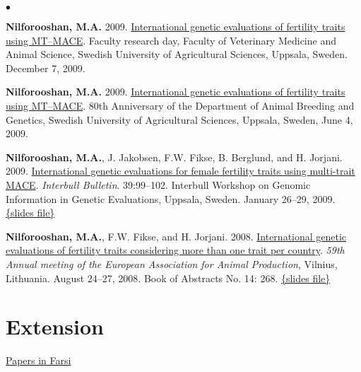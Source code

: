\documentclass[margin,line]{res}
\newenvironment{list2}{
  \begin{list}{$\bullet$}{%
    \setlength{\itemsep}{0in}
    \setlength{\parsep}{0in} \setlength{\parskip}{0in}
    \setlength{\topsep}{0in} \setlength{\partopsep}{0in}
    \setlength{\leftmargin}{0.2in}}}
  {\end{list}}
\begin{document}
\begin{resume}
\begin{list2}
    \item {\bf Nilforooshan, M.A.} 2009. \href{https://drive.google.com/file/d/0B2l_izQwJmVpUC1TVkx2MVc1ZUE/view?usp=sharing&resourcekey=0-l8dXNYtXDSBuYJHiZwAxZQ}{International genetic evaluations of fertility traits using MT–MACE}. Faculty research day, Faculty of Veterinary Medicine and Animal Science, Swedish University of Agricultural Sciences, Uppsala, Sweden. December 7, 2009.
    \item {\bf Nilforooshan, M.A.} 2009. \href{https://drive.google.com/file/d/0B2l_izQwJmVpUC1TVkx2MVc1ZUE/view?usp=sharing&resourcekey=0-l8dXNYtXDSBuYJHiZwAxZQ}{International genetic evaluations of fertility traits using MT–MACE}. 80th Anniversary of the Department of Animal Breeding and Genetics, Swedish University of Agricultural Sciences, Uppsala, Sweden, June 4, 2009.
    \item {\bf Nilforooshan, M.A.}, J. Jakobsen, F.W. Fikse, B. Berglund, and H. Jorjani. 2009. \href{https://www.researchgate.net/publication/237781427_International_Genetic_Evaluations_for_Female_Fertility_Traits_Using_Multi-trait_MACE}{International genetic evaluations for female fertility traits using multi-trait MACE}. {\em Interbull Bulletin}. 39:99--102. Interbull Workshop on Genomic Information in Genetic Evaluations, Uppsala, Sweden. January 26--29, 2009. \href{https://drive.google.com/file/d/0B2l_izQwJmVpZG1sZlg2cF9zRWc/view?usp=sharing&resourcekey=0-JmFa0ZnWzZzcCnjVFH3VoA}{\{slides file\}}
    \item {\bf Nilforooshan, M.A.}, F.W. Fikse, and H. Jorjani. 2008. \href{https://www.researchgate.net/publication/358219159_International_genetic_evaluations_of_fertility_traits_considering_more_than_one_trait_per_country}{International genetic evaluations of fertility traits considering more than one trait per country}. {\em 59th Annual meeting of the European Association for Animal Production}, Vilnius, Lithuania. August 24--27, 2008. Book of Abstracts No. 14: 268. \href{https://drive.google.com/file/d/0B2l_izQwJmVpd2pieXNtWTQxMkE/view?usp=sharing&resourcekey=0-Q2h6mMWM8Aw-Tsi787os4g}{\{slides file\}}
  \end{list2}
  \section{\sc Extension}

  \href{https://nilforooshan.github.io/resume/extension}{Papers in Farsi}

\end{resume}
\end{document}
